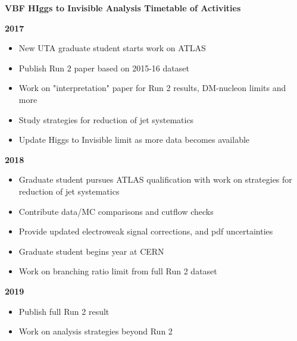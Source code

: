 \textbf{VBF HIggs to Invisible Analysis Timetable of Activities}

\textbf{2017}
\begin{itemize}[noitemsep,nolistsep]
\item{New UTA graduate student starts work on ATLAS}
\item{Publish Run 2 paper based on 2015-16 dataset}
\item{Work on "interpretation" paper for Run 2 results, DM-nucleon limits and more}
\item{Study strategies for reduction of jet systematics}
\item{Update Higgs to Invisible limit as more data becomes available}
\end{itemize}

\textbf{2018}
\begin{itemize}[noitemsep,nolistsep]
\item{Graduate student pursues ATLAS qualification with work on strategies for reduction of jet systematics}
\item{Contribute data/MC comparisons and cutflow checks}
\item{Provide updated electroweak signal corrections, and pdf uncertainties}
\item{Graduate student begins year at CERN}
\item{Work on branching ratio limit from full Run 2 dataset}
\end{itemize}

\textbf{2019}
\begin{itemize}[noitemsep,nolistsep]
\item{Publish full Run 2 result}
\item{Work on analysis strategies beyond Run 2}
\end{itemize}
